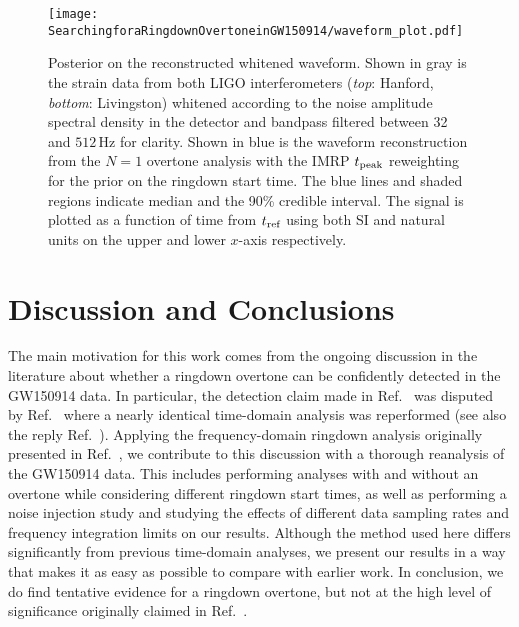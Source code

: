 \begin{figure*}[t]
	\centering
	\texttt{[image: SearchingforaRingdownOvertoneinGW150914/waveform\_plot.pdf]}
	\caption[Posterior on the GW150914 reconstructed whitened waveform]{ 
		Posterior on the reconstructed whitened waveform.
		Shown in gray is the strain data from both LIGO interferometers (\emph{top}: Hanford, \emph{bottom}: Livingston) whitened according to the noise amplitude spectral density in the detector and bandpass filtered between 32 and $512\,\mathrm{Hz}$ for clarity.
		Shown in blue is the waveform reconstruction from the $N=1$ overtone analysis with the IMRP $t_{\rm peak}$ reweighting for the prior on the ringdown start time.
		The blue lines and shaded regions indicate median and the 90\% credible interval. 
		The signal is plotted as a function of time from $t_{\rm ref}$ using both SI and natural units on the upper and lower $x$-axis respectively.
	}
	\label{fig:waveform}
\end{figure*}


\section{Discussion and Conclusions}\label{sec:discussion}

The main motivation for this work comes from the ongoing discussion in the literature about whether a ringdown overtone can be confidently detected in the GW150914 data. 
In particular, the detection claim made in Ref.~\cite{Isi:2019aib} was disputed by Ref.~\cite{Cotesta:2022pci} where a nearly identical time-domain analysis was reperformed (see also the reply Ref.~\cite{Isi:2022mhy}).
Applying the frequency-domain ringdown analysis originally presented in Ref.~\cite{Finch:2021qph}, we contribute to this discussion with a thorough reanalysis of the GW150914 data. 
This includes performing analyses with and without an overtone while considering different ringdown start times, as well as performing a noise injection study and studying the effects of different data sampling rates and frequency integration limits on our results.
Although the method used here differs significantly from previous time-domain analyses, we present our results in a way that makes it as easy as possible to compare with earlier work.
In conclusion, we do find tentative evidence for a ringdown overtone, but not at the high level of significance originally claimed in Ref.~\cite{Isi:2019aib}.

